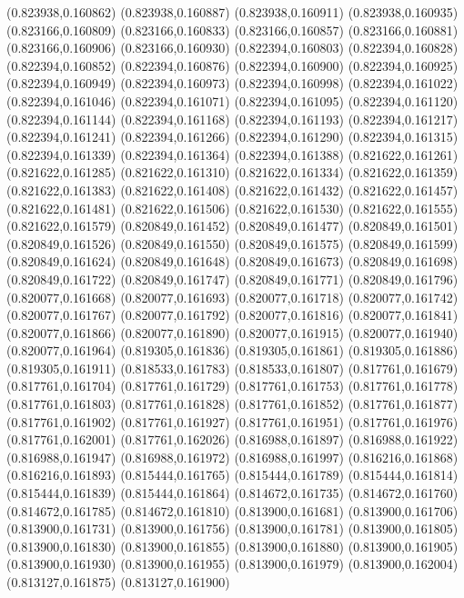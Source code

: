 (0.823938,0.160862)
(0.823938,0.160887)
(0.823938,0.160911)
(0.823938,0.160935)
(0.823166,0.160809)
(0.823166,0.160833)
(0.823166,0.160857)
(0.823166,0.160881)
(0.823166,0.160906)
(0.823166,0.160930)
(0.822394,0.160803)
(0.822394,0.160828)
(0.822394,0.160852)
(0.822394,0.160876)
(0.822394,0.160900)
(0.822394,0.160925)
(0.822394,0.160949)
(0.822394,0.160973)
(0.822394,0.160998)
(0.822394,0.161022)
(0.822394,0.161046)
(0.822394,0.161071)
(0.822394,0.161095)
(0.822394,0.161120)
(0.822394,0.161144)
(0.822394,0.161168)
(0.822394,0.161193)
(0.822394,0.161217)
(0.822394,0.161241)
(0.822394,0.161266)
(0.822394,0.161290)
(0.822394,0.161315)
(0.822394,0.161339)
(0.822394,0.161364)
(0.822394,0.161388)
(0.821622,0.161261)
(0.821622,0.161285)
(0.821622,0.161310)
(0.821622,0.161334)
(0.821622,0.161359)
(0.821622,0.161383)
(0.821622,0.161408)
(0.821622,0.161432)
(0.821622,0.161457)
(0.821622,0.161481)
(0.821622,0.161506)
(0.821622,0.161530)
(0.821622,0.161555)
(0.821622,0.161579)
(0.820849,0.161452)
(0.820849,0.161477)
(0.820849,0.161501)
(0.820849,0.161526)
(0.820849,0.161550)
(0.820849,0.161575)
(0.820849,0.161599)
(0.820849,0.161624)
(0.820849,0.161648)
(0.820849,0.161673)
(0.820849,0.161698)
(0.820849,0.161722)
(0.820849,0.161747)
(0.820849,0.161771)
(0.820849,0.161796)
(0.820077,0.161668)
(0.820077,0.161693)
(0.820077,0.161718)
(0.820077,0.161742)
(0.820077,0.161767)
(0.820077,0.161792)
(0.820077,0.161816)
(0.820077,0.161841)
(0.820077,0.161866)
(0.820077,0.161890)
(0.820077,0.161915)
(0.820077,0.161940)
(0.820077,0.161964)
(0.819305,0.161836)
(0.819305,0.161861)
(0.819305,0.161886)
(0.819305,0.161911)
(0.818533,0.161783)
(0.818533,0.161807)
(0.817761,0.161679)
(0.817761,0.161704)
(0.817761,0.161729)
(0.817761,0.161753)
(0.817761,0.161778)
(0.817761,0.161803)
(0.817761,0.161828)
(0.817761,0.161852)
(0.817761,0.161877)
(0.817761,0.161902)
(0.817761,0.161927)
(0.817761,0.161951)
(0.817761,0.161976)
(0.817761,0.162001)
(0.817761,0.162026)
(0.816988,0.161897)
(0.816988,0.161922)
(0.816988,0.161947)
(0.816988,0.161972)
(0.816988,0.161997)
(0.816216,0.161868)
(0.816216,0.161893)
(0.815444,0.161765)
(0.815444,0.161789)
(0.815444,0.161814)
(0.815444,0.161839)
(0.815444,0.161864)
(0.814672,0.161735)
(0.814672,0.161760)
(0.814672,0.161785)
(0.814672,0.161810)
(0.813900,0.161681)
(0.813900,0.161706)
(0.813900,0.161731)
(0.813900,0.161756)
(0.813900,0.161781)
(0.813900,0.161805)
(0.813900,0.161830)
(0.813900,0.161855)
(0.813900,0.161880)
(0.813900,0.161905)
(0.813900,0.161930)
(0.813900,0.161955)
(0.813900,0.161979)
(0.813900,0.162004)
(0.813127,0.161875)
(0.813127,0.161900)
